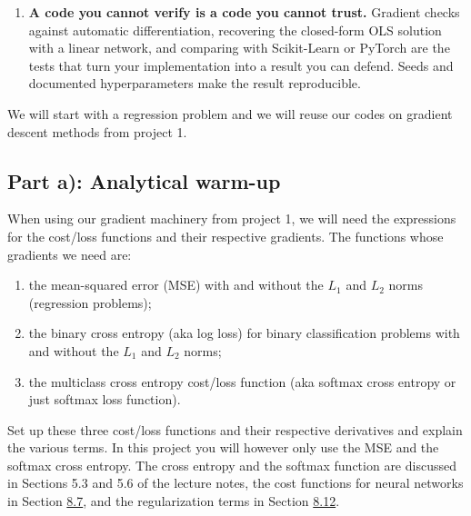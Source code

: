\documentclass[11pt,a4paper]{article}
\begin{document}
\begin{enumerate}[nosep]
        of 97\% on MNIST is good only if you know that guessing gives 10\%,
        that logistic regression on raw pixels gives roughly 92\% and that
        convolutional networks reach above 99\%.  A confusion matrix tells
        you which errors remain; the accuracy alone does not.
  \item \textbf{A code you cannot verify is a code you cannot trust.}
        Gradient checks against automatic differentiation, recovering the
        closed-form OLS solution with a linear network, and comparing with
        Scikit-Learn or PyTorch are the tests that turn your implementation
        into a result you can defend.  Seeds and documented hyperparameters
        make the result reproducible.
\end{enumerate}

We will start with a regression problem and we will reuse our codes on
gradient descent methods from project 1.

\subsection*{Part a): Analytical warm-up}

When using our gradient machinery from project 1, we will need the
expressions for the cost/loss functions and their respective gradients.  The
functions whose gradients we need are:
\begin{enumerate}[nosep]
  \item the mean-squared error (MSE) with and without the $L_1$ and $L_2$
        norms (regression problems);
  \item the binary cross entropy (aka log loss) for binary classification
        problems with and without the $L_1$ and $L_2$ norms;
  \item the multiclass cross entropy cost/loss function (aka softmax cross
        entropy or just softmax loss function).
\end{enumerate}
Set up these three cost/loss functions and their respective derivatives and
explain the various terms.  In this project you will however only use the
MSE and the softmax cross entropy.  The cross entropy and the softmax
function are discussed in Sections 5.3 and 5.6 of the lecture notes, the
cost functions for neural networks in Section
\href{https://educationalmaterialuio.github.io/MachineLearningUiO/doc/LectureNotes/_build/html/chapter8.html#the-cost-function-and-the-optimisation-problem}{8.7},
and the regularization terms in Section
\href{https://educationalmaterialuio.github.io/MachineLearningUiO/doc/LectureNotes/_build/html/chapter8.html#regularisation-and-hyperparameters}{8.12}.
\end{document}
